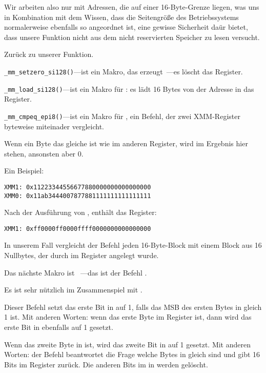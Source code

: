 Wir arbeiten also nur mit Adressen, die auf einer 16-Byte-Grenze liegen, was uns in Kombination mit dem Wissen, dass die
Seitengröße des Betriebssystems normalerweise ebenfalls so angeordnet ist, eine gewisse Sicherheit daür bietet, dass
unsere Funktion nicht aus dem nicht reservierten Speicher zu lesen versucht.

Zurück zu unserer Funktion.

\verb|_mm_setzero_si128()|---ist ein Makro, das  erzeugt~---es löscht das  Register.

\verb|_mm_load_si128()|---ist ein Makro für \MOVDQA: es lädt 16 Bytes von der Adresse in das  Register.

\verb|_mm_cmpeq_epi8()|---ist ein Makro für \PCMPEQB, ein Befehl, der zwei XMM-Register byteweise miteinader vergleicht.

Wenn ein Byte das gleiche ist wie im anderen Register, wird im Ergebnis hier  stehen, ansonsten aber 0.

Ein Beispiel:

\begin{verbatim}
XMM1: 0x11223344556677880000000000000000
XMM0: 0x11ab3444007877881111111111111111
\end{verbatim}

Nach der Ausführung von , enthält das  Register:

\begin{verbatim}
XMM1: 0xff0000ff0000ffff0000000000000000
\end{verbatim}
In unserem Fall vergleicht der Befehl jeden 16-Byte-Block mit einem Block aus 16 Nullbytes, der durch  im  Register angelegt wurde.


Das nächste Makro ist ~---das ist der Befehl .

Es ist sehr nützlich im Zusammenspiel mit \PCMPEQB.

Dieser Befehl setzt das erste Bit in \EAX auf 1, falls das MSB des ersten Bytes in  gleich 1 ist.
Mit anderen Worten: wenn das erste Byte im  Register  ist, dann wird das erste Bit in \EAX ebenfalls auf
1 gesetzt.

Wenn das zweite Byte in   ist, wird das zweite Bit in \EAX auf 1 gesetzt.
Mit anderen Worten: der Befehl beantwortet die Frage welche Bytes in  gleich  sind und gibt 16 Bits im
\EAX Register zurück.
Die anderen Bits im in \EAX werden gelöscht.

